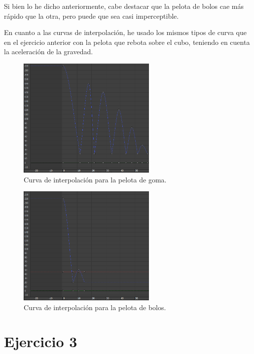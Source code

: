 \documentclass{article}
\begin{document}
Si bien lo he dicho anteriormente, cabe destacar que la pelota de bolos cae más rápido que la otra, pero puede que sea casi imperceptible.

\bigskip

En cuanto a las curvas de interpolación, he usado los mismos tipos de curva que en el ejercicio anterior con la pelota que rebota sobre el cubo, teniendo en cuenta la aceleración de la gravedad. 

\begin{figure}[H]
    \centering
    \includegraphics[width=0.6\textwidth]{imagenes/Ejercicio 2/curva_p1.png}
    \caption{Curva de interpolación para la pelota de goma.}
\end{figure}

\begin{figure}[H]
    \centering
    \includegraphics[width=0.6\textwidth]{imagenes/Ejercicio 2/curva_p2.png}
    \caption{Curva de interpolación para la pelota de bolos.}
\end{figure}


\section{Ejercicio 3}
\end{document}
